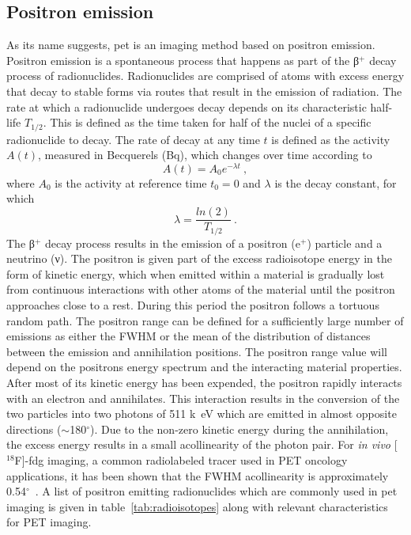 \subsection{Positron emission}
As its name suggests, \gls{pet} is an imaging method based on positron emission. Positron emission is a spontaneous process that happens as part of the β$^{+}$ decay process of radionuclides. 
Radionuclides are comprised of atoms with excess energy that decay to stable forms via routes that result in the emission of radiation.
The rate at which a radionuclide undergoes decay depends on its characteristic half-life $T_{1/2}$. This is defined as the time taken for half of the nuclei of a specific radionuclide to decay. The rate of decay at any time $t$ is defined as the activity $A(t)$, measured in Becquerels (Bq), which changes over time according to
\begin{equation} \label{Decay}
A(t) = A_0 e^{-\lambda t} \ ,
\end{equation}
where $A_0$ is the activity at reference time $t_0=0$ and $\lambda$ is the decay constant, for which 
\begin{equation} \label{Decayconstant}
\lambda = \frac{ln(2)}{T_{1/2}} \ .
\end{equation}
%
The β$^{+}$ decay process results in the emission of a positron (e$^{+}$) particle and a neutrino (ν). The positron is given part of the excess radioisotope energy in the form of kinetic energy, which when emitted within a material is gradually lost from continuous interactions with other atoms of the material until the positron approaches close to a rest. During this period the positron follows a tortuous random path. The positron range can be defined for a sufficiently large number of emissions as either the FWHM or the mean of the distribution of distances between the emission and annihilation positions. The positron range value will depend on the positrons energy spectrum and the interacting material properties. After most of its kinetic energy has been expended, the positron rapidly interacts with an electron and annihilates. This interaction results in the conversion of the two particles into two photons of 511 \si{k\electronvolt} which are emitted in almost opposite directions ($\sim$180$^{\circ}$). Due to the non-zero kinetic energy during the annihilation, the excess energy results in a small acollinearity of the photon pair. For \textit{in vivo} [$^{18}$F]-\gls{fdg} imaging, a common radiolabeled tracer used in PET oncology applications, it has been shown that the FWHM acollinearity is approximately 0.54$^{\circ}$~\cite{Shibuya2007}.
%
A list of positron emitting radionuclides which are commonly used in \gls{pet} imaging is given in table~\ref{tab:radioisotopes} along with relevant characteristics for PET imaging.

